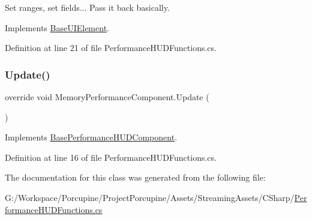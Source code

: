 Set ranges, set fields... Pass it back basically. 



Implements \hyperlink{class_base_u_i_element_a9a0aa6ac0b194f90e092b372adce4e30}{Base\+U\+I\+Element}.



Definition at line 21 of file Performance\+H\+U\+D\+Functions.\+cs.

\mbox{\label{class_memory_performance_component_a2eaccb31c5bb64588824bbccd2ec953b}} 
\subsubsection{\texorpdfstring{Update()}{Update()}}
{\footnotesize\ttfamily override void Memory\+Performance\+Component.\+Update (\begin{DoxyParamCaption}{ }\end{DoxyParamCaption})\hspace{0.3cm}{\ttfamily [virtual]}}



Implements \hyperlink{class_base_performance_h_u_d_component_a7a585b4c22bd5b3daee51bf126fa1cec}{Base\+Performance\+H\+U\+D\+Component}.



Definition at line 16 of file Performance\+H\+U\+D\+Functions.\+cs.



The documentation for this class was generated from the following file\+:\begin{DoxyCompactItemize}
\item 
G\+:/\+Workspace/\+Porcupine/\+Project\+Porcupine/\+Assets/\+Streaming\+Assets/\+C\+Sharp/\hyperlink{_performance_h_u_d_functions_8cs}{Performance\+H\+U\+D\+Functions.\+cs}\end{DoxyCompactItemize}

